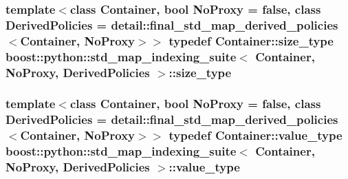 \hypertarget{classboost_1_1python_1_1std__map__indexing__suite_ad1c24ad53b2e27b061f75591c74296c2}{
\subsubsection[{size\-\_\-type}]{\setlength{\rightskip}{0pt plus 5cm}template$<$class \-Container, bool \-No\-Proxy = false, class \-Derived\-Policies = detail\-::final\-\_\-std\-\_\-map\-\_\-derived\-\_\-policies$<$\-Container, No\-Proxy$>$$>$ typedef \-Container\-::size\-\_\-type {\bf boost\-::python\-::std\-\_\-map\-\_\-indexing\-\_\-suite}$<$ \-Container, \-No\-Proxy, \-Derived\-Policies $>$\-::{\bf size\-\_\-type}}}\label{classboost_1_1python_1_1std__map__indexing__suite_ad1c24ad53b2e27b061f75591c74296c2}
\hypertarget{classboost_1_1python_1_1std__map__indexing__suite_aff9ed68cf30e805a04a313d92c62ab38}{
\subsubsection[{value\-\_\-type}]{\setlength{\rightskip}{0pt plus 5cm}template$<$class \-Container, bool \-No\-Proxy = false, class \-Derived\-Policies = detail\-::final\-\_\-std\-\_\-map\-\_\-derived\-\_\-policies$<$\-Container, No\-Proxy$>$$>$ typedef \-Container\-::value\-\_\-type {\bf boost\-::python\-::std\-\_\-map\-\_\-indexing\-\_\-suite}$<$ \-Container, \-No\-Proxy, \-Derived\-Policies $>$\-::{\bf value\-\_\-type}}}\label{classboost_1_1python_1_1std__map__indexing__suite_aff9ed68cf30e805a04a313d92c62ab38}


